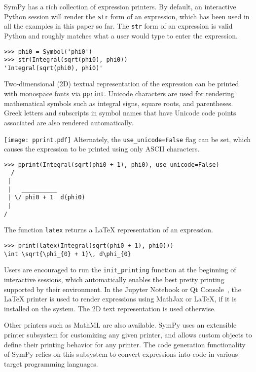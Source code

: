 SymPy has a rich collection of expression printers.
By default, an interactive Python session will render the
\verb|str| form of an expression, which has been used in all the examples in
this paper so far. The \verb|str| form of an expression is valid Python and
roughly matches what a user would type to enter the expression.

\begin{verbatim}
>>> phi0 = Symbol('phi0')
>>> str(Integral(sqrt(phi0), phi0))
'Integral(sqrt(phi0), phi0)'
\end{verbatim}

Two-dimensional (2D) textual representation of the expression can
be printed with monospace fonts via \verb|pprint|.
Unicode characters are used for rendering mathematical symbols such as integral signs,
square roots, and parentheses. Greek letters and subscripts in symbol names
that have Unicode code points associated
are also rendered automatically.

\noindent
\texttt{[image: pprint.pdf]}
Alternately, the \verb|use_unicode=False| flag can be set, which causes the
expression to be printed using only ASCII characters.

\begin{verbatim}
>>> pprint(Integral(sqrt(phi0 + 1), phi0), use_unicode=False)
  /
 |
 |   __________
 | \/ phi0 + 1  d(phi0)
 |
/
\end{verbatim}

The function \verb|latex| returns a \LaTeX{} representation of an expression.

\begin{verbatim}
>>> print(latex(Integral(sqrt(phi0 + 1), phi0)))
\int \sqrt{\phi_{0} + 1}\, d\phi_{0}
\end{verbatim}

Users are encouraged to run the \verb|init_printing| function at the beginning
of interactive sessions, which automatically enables the best pretty printing
supported by their environment. In the Jupyter Notebook or Qt
Console~\cite{perez2007ipython}, the \LaTeX{} printer is used to render
expressions using MathJax or \LaTeX{}, if it is installed on the system. The
2D text representation is used otherwise.

Other printers such as MathML are also available. SymPy uses an extensible
printer subsystem for customizing any given
printer, and allows custom objects to define their printing behavior for any
printer. The code generation functionality of SymPy
relies on this subsystem to convert expressions into code in various target
programming languages.
